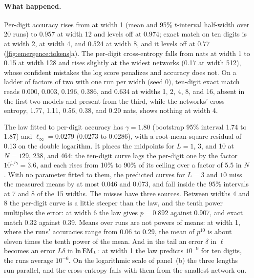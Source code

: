 \begin{refsection}
\paragraph{What happened.} Per-digit accuracy rises from  at width 1 (mean and 95\% $t$-interval half-width over 20 runs) to 0.957 at width 12 and levels off at 0.974; exact match on ten digits is  at width 2,  at width 4, and 0.524 at width 8, and it levels off at 0.77 (\cref{fig:emergence:tokens}a). The per-digit cross-entropy falls from  nats at width 1 to 0.15 at width 128 and rises slightly at the widest networks (0.17 at width 512), whose confident mistakes the log score penalizes and accuracy does not. On a ladder of factors of two with one run per width (seed 0), ten-digit exact match reads 0.000, 0.003, 0.196, 0.386, and 0.634 at widths 1, 2, 4, 8, and 16, absent in the first two models and present from the third, while the networks' cross-entropy, 1.77, 1.11, 0.56, 0.38, and 0.20 nats, shows nothing at width 4.

The law fitted to per-digit accuracy has $\gamma=1.80$ (bootstrap 95\% interval 1.74 to 1.87) and $\ell_\infty=0.0279$ (0.0273 to 0.0286), with a root-mean-square residual of 0.13 on the double logarithm. It places the midpoints for $L=1$, 3, and 10 at $N=129$, 238, and 464: the ten-digit curve lags the per-digit one by the factor $10^{1/\gamma}=3.6$, and each rises from 10\% to 90\% of its ceiling over a factor of 5.5 in $N$. With no parameter fitted to them, the predicted curves for $L=3$ and $10$ miss the measured means by at most 0.046 and 0.073, and fall inside the 95\% intervals at 7 and 8 of the 15 widths. The misses have three sources. Between widths 4 and 8 the per-digit curve is a little steeper than the law, and the tenth power multiplies the error: at width 6 the law gives $p=0.892$ against 0.907, and exact match 0.32 against 0.39. Means over runs are not powers of means: at width 1, where the runs' accuracies range from 0.06 to 0.29, the mean of $p^{10}$ is about eleven times the tenth power of the mean. And in the tail an error $\delta$ in $\ell$ becomes an error $L\delta$ in $\ln\mathrm{EM}_L$: at width 1 the law predicts $10^{-9}$ for ten digits, the runs average $10^{-6}$. On the logarithmic scale of panel~(b) the three lengths run parallel, and the cross-entropy falls with them from the smallest network on.


\end{refsection}
